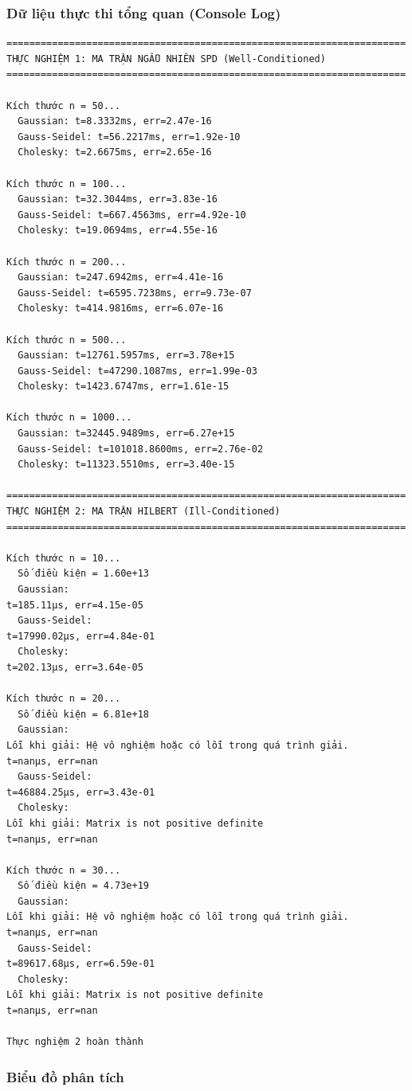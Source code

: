 \documentclass[12pt,a4paper]{article}
\begin{document}
\subsubsection{Dữ liệu thực thi tổng quan (Console Log)}
\begin{verbatim}
======================================================================
THỰC NGHIỆM 1: MA TRẬN NGẪU NHIÊN SPD (Well-Conditioned)
======================================================================

Kích thước n = 50...
  Gaussian: t=8.3332ms, err=2.47e-16
  Gauss-Seidel: t=56.2217ms, err=1.92e-10
  Cholesky: t=2.6675ms, err=2.65e-16

Kích thước n = 100...
  Gaussian: t=32.3044ms, err=3.83e-16
  Gauss-Seidel: t=667.4563ms, err=4.92e-10
  Cholesky: t=19.0694ms, err=4.55e-16

Kích thước n = 200...
  Gaussian: t=247.6942ms, err=4.41e-16
  Gauss-Seidel: t=6595.7238ms, err=9.73e-07
  Cholesky: t=414.9816ms, err=6.07e-16

Kích thước n = 500...
  Gaussian: t=12761.5957ms, err=3.78e+15
  Gauss-Seidel: t=47290.1087ms, err=1.99e-03
  Cholesky: t=1423.6747ms, err=1.61e-15

Kích thước n = 1000...
  Gaussian: t=32445.9489ms, err=6.27e+15
  Gauss-Seidel: t=101018.8600ms, err=2.76e-02
  Cholesky: t=11323.5510ms, err=3.40e-15

======================================================================
THỰC NGHIỆM 2: MA TRẬN HILBERT (Ill-Conditioned)
======================================================================

Kích thước n = 10...
  Số điều kiện = 1.60e+13
  Gaussian:
t=185.11µs, err=4.15e-05
  Gauss-Seidel:
t=17990.02µs, err=4.84e-01
  Cholesky:
t=202.13µs, err=3.64e-05

Kích thước n = 20...
  Số điều kiện = 6.81e+18
  Gaussian:
Lỗi khi giải: Hệ vô nghiệm hoặc có lỗi trong quá trình giải.
t=nanµs, err=nan
  Gauss-Seidel:
t=46884.25µs, err=3.43e-01
  Cholesky:
Lỗi khi giải: Matrix is not positive definite
t=nanµs, err=nan

Kích thước n = 30...
  Số điều kiện = 4.73e+19
  Gaussian:
Lỗi khi giải: Hệ vô nghiệm hoặc có lỗi trong quá trình giải.
t=nanµs, err=nan
  Gauss-Seidel:
t=89617.68µs, err=6.59e-01
  Cholesky:
Lỗi khi giải: Matrix is not positive definite
t=nanµs, err=nan

Thực nghiệm 2 hoàn thành
\end{verbatim}

\subsubsection{Biểu đồ phân tích}
\end{document}
